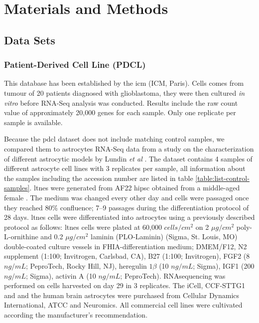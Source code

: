 \section{Materials and Methods}

\subsection{Data Sets}

\subsubsection{Patient-Derived Cell Line (PDCL)}

This database has been established by the \acrlong{icm} (ICM, Paris).
Cells comes from tumour of 20 patients diagnosed with glioblastoma, they were then cultured \textit{in vitro} before RNA-Seq analysis was conducted.
Results include the raw count value of approximately 20,000 genes for each sample.
Only one replicate per sample is available.

Because the \acrshort{pdcl} dataset does not include matching control samples, we compared them to astrocytes RNA-Seq data from a study on the characterization of different astrocytic models by Lundin \textit{et al} \cite*{Lundin2018}.
The dataset contains 4 samples of different astrocyte cell lines with 3 replicates per sample, all information about the samples including the accession number are listed in table \ref*{table:list-control-samples}.
\acrfull{ltnes} were generated from AF22 \acrfull{hipsc} obtained from a middle-aged female \cite*{Falk2012}.
The medium was changed every other day and cells were passaged once they reached 80\% confluence; 7–9 passages during the differentiation protocol of 28 days.
\acrshort{ltnes} cells were differentiated into astrocytes using a previously described protocol \cite*{Lundin2018} as follows: \acrshort{ltnes} cells were plated at 60,000 $cells/cm^2$ on 2 $\mu g/cm^2$ poly-L-ornithine and 0.2 $\mu g/cm^2$ laminin (PLO-Laminin) (Sigma, St. Louis, MO) double-coated culture vessels in FHIA-differentiation medium; DMEM/F12, N2 supplement (1:100; Invitrogen, Carlsbad, CA), B27 (1:100; Invitrogen), FGF2 (8 $ng/mL$; PeproTech, Rocky Hill, NJ), heregulin $1 \beta$ (10 $ng/mL$; Sigma), IGF1 (200 $ng/mL$; Sigma), activin A (10 $ng/mL$; PeproTech).
RNAsequencing was performed on cells harvested on day 29 in 3 replicates.
The iCell, CCF-STTG1 and and the human brain astrocytes were purchased from Cellular Dynamics International, ATCC and Neuromics.
All commercial cell lines were cultivated according the manufacturer's recommendation.

